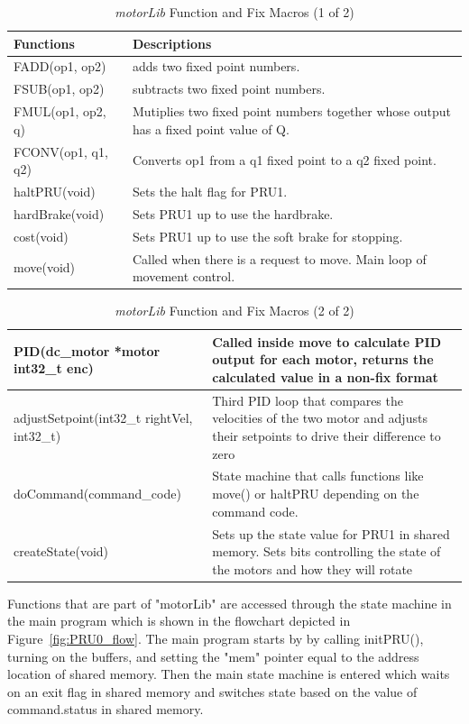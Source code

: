 \documentclass[12pt,oneside,final]{siuethesis}
\theoremstyle{definition}
\begin{document}
\begin{table}
    \begin{tabular}{ | l | p{10cm} |}
    	\hline
	Functions & Descriptions  \\ \hline
	FADD(op1, op2) & adds two fixed point numbers. \\ \hline
	FSUB(op1, op2) & subtracts two fixed point numbers. \\ \hline
	FMUL(op1, op2, q) & Mutiplies two fixed point numbers together whose output has a fixed point value of Q. \\ \hline
	FCONV(op1, q1, q2) & Converts op1 from a q1 fixed point to a q2 fixed point. \\ \hline
	haltPRU(void) & Sets the halt flag for PRU1. \\ \hline
	hardBrake(void) & Sets PRU1 up to use the hardbrake. \\ \hline
	cost(void) & Sets PRU1 up to use the soft brake for stopping. \\ \hline
	move(void) & Called when there is a request to move. Main loop of movement control. \\ \hline
\end{tabular}
     \caption{\emph{motorLib} Function and Fix Macros (1 of 2)}
 	\label{Tab:PRU0_Motor1}
\end{table}


\begin{table}
    \begin{tabular}{ | l | p{7cm} |}
    	\hline	
	PID(dc\_motor *motor int32\_t enc) & Called inside move to calculate PID output for each motor, returns the calculated value in a non-fix format \\ \hline
	adjustSetpoint(int32\_t rightVel, int32\_t) & Third PID loop that compares the velocities of the two motor and adjusts their setpoints to drive their difference to zero \\ \hline
	doCommand(command\_code) & State machine that calls functions like move() or haltPRU depending on the command code.	 \\ \hline
	createState(void) & Sets up the state value for PRU1 in shared memory. Sets bits controlling the state of the motors and how they will rotate \\ \hline

    \end{tabular}
     \caption{\emph{motorLib} Function and Fix Macros (2 of 2)}
 	\label{Tab:PRU0_Motor2}
\end{table}

Functions that are part of "motorLib" are accessed through the state machine in the main program which is shown in the flowchart depicted in Figure~\ref{fig:PRU0_flow}. The main program starts by  by calling initPRU(), turning on the buffers, and setting the "mem" pointer equal to the address location of shared memory. Then the main state machine is entered which waits on an exit flag in shared memory and switches state based on the value of command.status in shared memory. 
\end{document}

